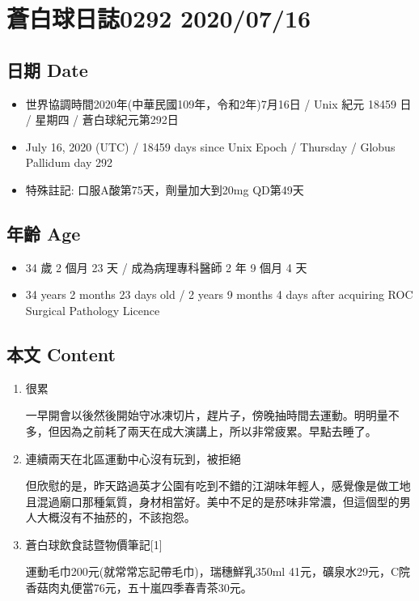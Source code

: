 \documentclass[a5paper, 11pt
]{book}
\providecommand{\tightlist}{%
  \setlength{\itemsep}{0pt}\setlength{\parskip}{0pt}}
\begin{document}
\hypertarget{ux84bcux767dux7403ux65e5ux8a8c0292-20200716}{%
\section{蒼白球日誌0292
2020/07/16}\label{ux84bcux767dux7403ux65e5ux8a8c0292-20200716}}

\hypertarget{ux65e5ux671f-date-40}{%
\subsection{日期 Date}\label{ux65e5ux671f-date-40}}

\begin{itemize}
\tightlist
\item
  世界協調時間2020年(中華民國109年，令和2年)7月16日 / Unix 紀元 18459 日
  / 星期四 / 蒼白球紀元第292日
\item
  July 16, 2020 (UTC) / 18459 days since Unix Epoch / Thursday / Globus
  Pallidum day 292
\item
  特殊註記: 口服A酸第75天，劑量加大到20mg QD第49天
\end{itemize}

\hypertarget{ux5e74ux9f61-age-40}{%
\subsection{年齡 Age}\label{ux5e74ux9f61-age-40}}

\begin{itemize}
\tightlist
\item
  34 歲 2 個月 23 天 / 成為病理專科醫師 2 年 9 個月 4 天
\item
  34 years 2 months 23 days old / 2 years 9 months 4 days after
  acquiring ROC Surgical Pathology Licence
\end{itemize}

\hypertarget{ux672cux6587-content-40}{%
\subsection{本文 Content}\label{ux672cux6587-content-40}}

\begin{enumerate}
\def\labelenumi{\arabic{enumi}.}
\item
  很累

  一早開會以後然後開始守冰凍切片，趕片子，傍晚抽時間去運動。明明量不多，但因為之前耗了兩天在成大演講上，所以非常疲累。早點去睡了。
\item
  連續兩天在北區運動中心沒有玩到，被拒絕

  但欣慰的是，昨天路過英才公園有吃到不錯的江湖味年輕人，感覺像是做工地且混過廟口那種氣質，身材相當好。美中不足的是菸味非常濃，但這個型的男人大概沒有不抽菸的，不該抱怨。
\item
  蒼白球飲食誌暨物價筆記{[}1{]}

  運動毛巾200元(就常常忘記帶毛巾)，瑞穗鮮乳350ml
  41元，礦泉水29元，C院香菇肉丸便當76元，五十嵐四季春青茶30元。
\end{enumerate}
\end{document}

